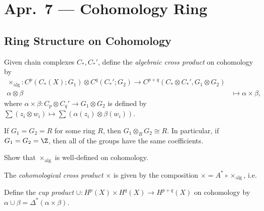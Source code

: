 \chapter{Apr.~7 --- Cohomology Ring}

\section{Ring Structure on Cohomology}

\begin{definition}
  Given chain complexes $C_*, C_*'$, define
  the \emph{algebraic cross product} on
  cohomology by
  \begin{align*}
    \times_{\mathrm{alg}} : C^p(C_*(X); G_1)
    \otimes C^q(C_*'; G_2)
    \longrightarrow C^{p + q}(C_* \otimes C_*', G_1 \otimes G_2) \\
    \alpha \otimes \beta
    &\longmapsto
    \alpha \times \beta,
  \end{align*}
  where $\alpha \times \beta : C_p \otimes C_q' \to G_1 \otimes G_2$ is defined by
  $\sum (z_i \otimes w_i) \mapsto \sum (\alpha(z_i) \otimes \beta(w_i))$.
\end{definition}

\begin{remark}
  If $G_1 = G_2 = R$ for some ring $R$, then
  $G_1 \otimes_R G_2 \cong R$. In particular,
  if $G_1 = G_2 = \Z$, then all of the groups
  have the same coefficients.
\end{remark}

\begin{exercise}
  Show that $\times_{\mathrm{alg}}$ is
  well-defined on cohomology.
\end{exercise}

\begin{definition}
  The \emph{cohomological cross product}
  $\times$ is given by the composition
  $\times = A^* \circ \times_{\mathrm{alg}}$,
  i.e.
  \begin{center}
  \end{center}
  Define the \emph{cup product}
  $\cup : H^p(X) \times H^q(X) \to H^{p+q}(X)$
  on cohomology by
  $\alpha \cup \beta = \Delta^*(\alpha \times \beta)$.
\end{definition}

